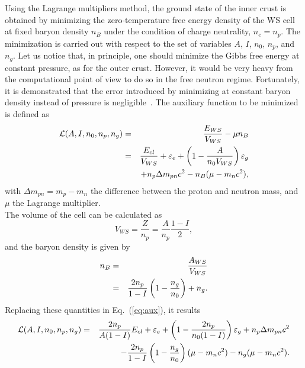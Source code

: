 Using the Lagrange multipliers method, the ground state of the inner crust is
obtained by minimizing the zero-temperature free
energy density of the WS cell at fixed baryon density $n_B$ under the condition 
of charge neutrality, $n_e = n_p$. The minimization is carried out with 
respect to the set of variables $A$, $I$, $n_0$, $n_p$, and $n_g$.
Let us notice that, in principle, one should minimize the Gibbs free energy at 
constant pressure, as for the outer crust. However, it would be very heavy from 
the computational point of view to do so in the free neutron regime.
Fortunately, it is demonstrated that the error introduced by minimizing at
constant baryon density instead of pressure is negligible~\cite{Pearson2012}.
The auxiliary function to be minimized is defined as
%
\begin{eqnarray}
  \mathcal{L}(A,I,n_0,n_p,n_g) &=& \frac{E_{WS}}{V_{WS}} - \mu n_B \notag \\
                      &=& \frac{E_{cl}}{V_{WS}} + \varepsilon_e +
              \left(1-\frac{A}{n_0V_{WS}}\right)\varepsilon_g \notag\\
                      &&+ n_p \Delta m_{pn}c^2 - n_B(\mu -
                      m_nc^2),\label{eq:aux}
\end{eqnarray}
%
with $\Delta m_{pn} = m_p - m_n$ the difference between the proton and neutron
mass, and $\mu$ the Lagrange multiplier.\\
The volume of the cell can be calculated as
%
\begin{equation}
  V_{WS} = \frac{Z}{n_p} = \frac{A}{n_p}\frac{1-I}{2},
\end{equation}
%
and the baryon density is given by 
%
\begin{eqnarray}
  n_B &=& \frac{A_{WS}}{V_{WS}} \notag\\
      &=& \frac{2n_p}{1-I}\left(1-\frac{n_g}{n_0}\right) + n_g.
\end{eqnarray}
%
Replacing these quantities in Eq.~(\ref{eq:aux}), it results
%
\begin{eqnarray}
  \mathcal{L}(A,I,n_0,n_p,n_g) &=& \frac{2n_p}{A(1-I)}E_{cl} + \varepsilon_e +
  \left(1-\frac{2n_p}{n_0(1-I)}\right)\varepsilon_g 
                      + n_p \Delta m_{pn}c^2 \notag\\
                      &&- \frac{2n_p}{1-I}\left(1-\frac{n_g}{n_0}\right)(\mu - m_nc^2)
                      - n_g(\mu - m_nc^2).\label{eq:aux_final}
\end{eqnarray}
%

